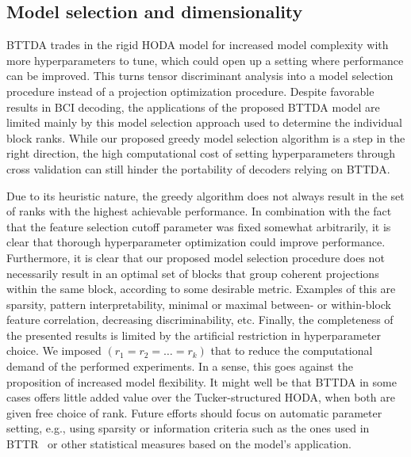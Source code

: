 \subsection{Model selection and dimensionality}

BTTDA trades in the rigid HODA model for increased model complexity with more
hyperparameters to tune, which could open up a setting where performance can be
improved.
This turns tensor discriminant analysis into a model selection procedure
instead of a projection optimization procedure.
Despite favorable results in BCI decoding, the applications of the proposed
BTTDA model are limited mainly by this model selection approach used
to determine the individual block ranks.
While our proposed greedy model selection algorithm is a step in the right
direction, the high computational cost of setting hyperparameters through cross
validation can still hinder the portability of decoders relying on
BTTDA.

Due to its heuristic nature, the greedy algorithm does not always result in the
set of ranks with the highest achievable performance.
In combination with the fact that the feature selection cutoff parameter was
fixed somewhat arbitrarily, it is clear that thorough
hyperparameter optimization could improve performance.
Furthermore, it is clear that our proposed model selection procedure does not
necessarily result in an optimal set of blocks that group coherent projections
within the same block, according to some desirable metric.
Examples of this are sparsity, pattern interpretability, minimal or maximal
between- or within-block feature correlation, decreasing discriminability, etc.
Finally, the completeness of the presented results is limited by the artificial
restriction in hyperparameter choice.
We imposed $(r_1=r_2=\ldots=r_k)$ that to reduce the computational demand of
the performed experiments.
In a sense, this goes against the proposition of increased model flexibility.
It might well be that BTTDA in some cases offers little added value over the
Tucker-structured HODA, when both are given free choice of rank.
Future efforts should focus on automatic parameter setting, e.g., using sparsity
or information criteria such as the ones used in BTTR~\cite{Faes2022} or other
statistical measures based on the model's application.

